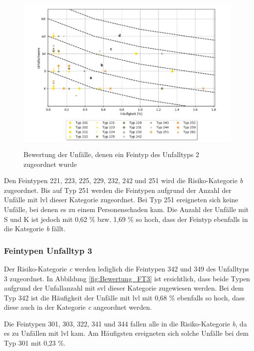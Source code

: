\begin{savenotes}
	\begin{figure}[H]
		\centering
		\includegraphics[width=12cm,height=8cm]{figures/Bewertung_FT2}
		\caption[Bewertung der Unfälle, denen ein Feintyp des Unfalltyps 2 zugeordnet wurde]{Bewertung der Unfälle, denen ein Feintyp des Unfalltyps 2 zugeordnet wurde}\label{fig:Bewertung_FT2}
	\end{figure}
\end{savenotes}

Den Feintypen 221, 223, 225, 229, 232, 242 und 251 wird die Risiko-Kategorie \textit{b} zugeordnet. Bis auf Typ 251 werden die Feintypen aufgrund der Anzahl der Unfälle mit \ac{lvl} dieser Kategorie zugeordnet. Bei Typ 251 ereigneten sich keine Unfälle, bei denen es zu einem Personenschaden kam. Die Anzahl der Unfälle mit \ac{S} und \ac{K} ist jedoch mit 0,62 \% bzw. 1,69 \% so hoch, dass der Feintyp ebenfalls in die Kategorie \textit{b} fällt.

\subsubsection{Feintypen Unfalltyp 3}
Der Risiko-Kategorie \textit{c} werden lediglich die Feintypen 342 und 349 des Unfalltyps 3 zugeordnet. In Abbildung \ref{fig:Bewertung_FT3} ist ersichtlich, dass beide Typen aufgrund der Unfallanzahl mit \ac{svl} dieser Kategorie zugewiesen werden. Bei dem Typ 342 ist die Häufigkeit der Unfälle mit \ac{lvl} mit 0,68 \% ebenfalls so hoch, dass diese auch in der Kategorie \textit{c} angeordnet werden.

Die Feintypen 301, 303, 322, 341 und 344 fallen alle in die Risiko-Kategorie \textit{b}, da es zu Unfällen mit \ac{lvl} kam. Am Häufigsten ereigneten sich solche Unfälle bei dem Typ 301 mit 0,23 \%.

